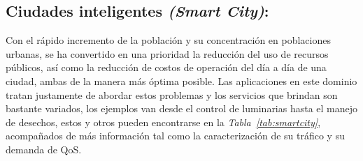 \subsection{Ciudades inteligentes \textit{(Smart City)}:}

Con el rápido incremento de la población y su concentración en poblaciones urbanas, se ha convertido en una prioridad la reducción del uso de recursos públicos, así como la reducción de costos de operación del día a día de una ciudad, ambas de la manera más óptima posible. Las aplicaciones en este dominio tratan justamente de abordar estos problemas y los servicios que brindan son bastante variados, los ejemplos van desde el control de luminarias hasta el manejo de desechos, estos y otros  pueden encontrarse en la \textit{Tabla~\ref{tab:smartcity}}, acompañados de más información tal como la caracterización de su tráfico y su demanda de QoS.\newline

